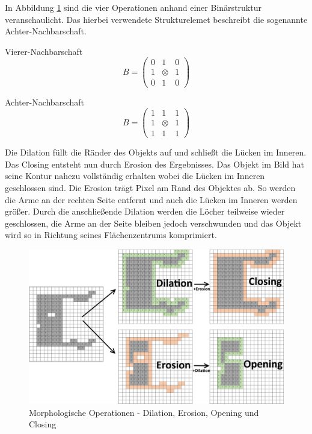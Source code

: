 In Abbildung \ref{fig:boxfilter} sind die vier Operationen anhand einer Bin\"arstruktur veranschaulicht. Das hierbei verwendete Strukturelemet beschreibt die sogenannte Achter-Nachbarschaft.
\begin{multicols}{2}
\centering
Vierer-Nachbarschaft
\[ B = 
\begin{pmatrix}
 0 & 1 & 0 \\ 1 & \otimes & 1 \\ 0 & 1 & 0
\end{pmatrix}
\]

\columnbreak

\centering
Achter-Nachbarschaft
\[ B = 
\begin{pmatrix}
 1 & 1 & 1 \\ 1 & \otimes & 1 \\ 1 & 1 & 1
\end{pmatrix}
\]
\end{multicols}
Die Dilation f\"ullt die R\"ander des Objekts auf und schlie\ss{}t die L\"ucken im Inneren. Das Closing entsteht nun durch Erosion des Ergebnisses. Das Objekt im Bild hat seine Kontur nahezu vollst\"andig erhalten wobei die L\"ucken im Inneren geschlossen sind.
Die Erosion tr\"agt Pixel am Rand des Objektes ab. So werden die Arme an der rechten Seite entfernt und auch die L\"ucken im Inneren werden gr\"o\ss{}er. Durch die anschlie\ss{}ende Dilation werden die L\"ocher teilweise wieder geschlossen, die Arme an der Seite bleiben jedoch verschwunden und das Objekt wird so in Richtung seines Fl\"achenzentrums komprimiert.

\begin{figure}
 \centering
 \includegraphics[width=1\textwidth]{media/morph/morph_all_text.png}
 \caption{Morphologische Operationen - Dilation, Erosion, Opening und Closing}
 \label{fig:boxfilter}
\end{figure}
